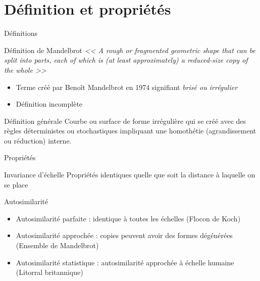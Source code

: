 \documentclass{beamer}
\begin{document}
\section{Définition et propriétés}
\begin{frame}{Définitions}
\begin{block}{Définition de Mandelbrot}
\itshape{<< A rough or fragmented geometric shape that
can be split into parts, each of which is (at least approximately) a reduced-size copy of the
whole >>}
\end{block}

\begin{block}{}
    \begin{itemize}
        \item Terme créé par Benoît Mandelbrot en 1974 signifiant \itshape{brisé} ou \itshape{irrégulier}
        \item Définition incomplète
    \end{itemize}
\end{block}

\begin{block}{Définition générale}
Courbe ou surface de forme irrégulière qui se créé avec des règles déterministes ou stochastiques impliquant une homothétie (agrandissement ou réduction) interne.
\end{block}
\end{frame}

\begin{frame}{Propriétés}
\begin{block}{Invariance d'échelle}
    Propriétés identiques quelle que soit la distance à laquelle on se place
\end{block}

\begin{block}{Autosimilarité}
    \begin{itemize}
        \item Autosimilarité parfaite : identique à toutes les échelles (Flocon de Koch)
        \item Autosimilarité approchée : copies peuvent avoir des formes dégénérées (Ensemble de Mandelbrot)
        \item Autosimilarité statistique : autosimilarité approchée à échelle humaine (Litorral britannique) 
    \end{itemize}
\end{block}
\end{frame}
\end{document}
